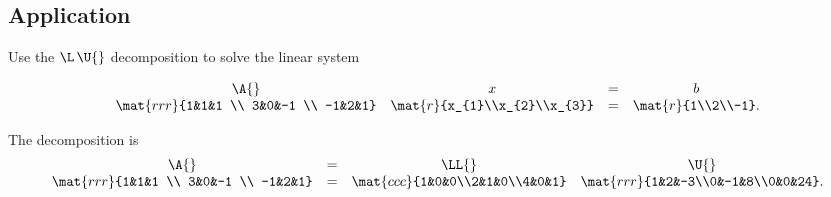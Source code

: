 \subsection{Application}
Use the $\L\,\U{}$ decomposition to solve the linear system

\begin{equation}
  \begin{array}{cccc}
    \A{}&x&=&b \\
    \mat{rrr}{1&1&1 \\ 3&0&-1 \\ -1&2&1}&
      \mat{r}{x_{1}\\x_{2}\\x_{3}} & = & 
    \mat{r}{1\\2\\-1}.
  \end{array}
\end{equation}

The decomposition is
\begin{equation}
  \begin{array}{cccc}
    \A{}&=&\LL{}&\U{}\\
    \mat{rrr}{1&1&1 \\ 3&0&-1 \\ -1&2&1} &=& \mat{ccc}{1&0&0\\2&1&0\\4&0&1}&\mat{rrr}{1&2&-3\\0&-1&8\\0&0&24}.
  \end{array}
\end{equation}

